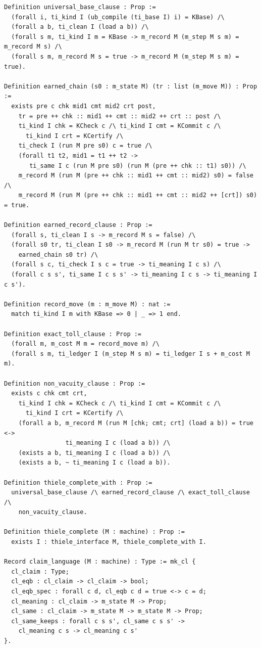 {\scriptsize
\begin{verbatim}
Definition universal_base_clause : Prop :=
  (forall i, ti_kind I (ub_compile (ti_base I) i) = KBase) /\
  (forall a b, ti_clean I (load a b)) /\
  (forall s m, ti_kind I m = KBase -> m_record M (m_step M s m) = m_record M s) /\
  (forall s m, m_record M s = true -> m_record M (m_step M s m) = true).

Definition earned_chain (s0 : m_state M) (tr : list (m_move M)) : Prop :=
  exists pre c chk mid1 cmt mid2 crt post,
    tr = pre ++ chk :: mid1 ++ cmt :: mid2 ++ crt :: post /\
    ti_kind I chk = KCheck c /\ ti_kind I cmt = KCommit c /\
      ti_kind I crt = KCertify /\
    ti_check I (run M pre s0) c = true /\
    (forall t1 t2, mid1 = t1 ++ t2 ->
       ti_same I c (run M pre s0) (run M (pre ++ chk :: t1) s0)) /\
    m_record M (run M (pre ++ chk :: mid1 ++ cmt :: mid2) s0) = false /\
    m_record M (run M (pre ++ chk :: mid1 ++ cmt :: mid2 ++ [crt]) s0) = true.

Definition earned_record_clause : Prop :=
  (forall s, ti_clean I s -> m_record M s = false) /\
  (forall s0 tr, ti_clean I s0 -> m_record M (run M tr s0) = true ->
    earned_chain s0 tr) /\
  (forall s c, ti_check I s c = true -> ti_meaning I c s) /\
  (forall c s s', ti_same I c s s' -> ti_meaning I c s -> ti_meaning I c s').

Definition record_move (m : m_move M) : nat :=
  match ti_kind I m with KBase => 0 | _ => 1 end.

Definition exact_toll_clause : Prop :=
  (forall m, m_cost M m = record_move m) /\
  (forall s m, ti_ledger I (m_step M s m) = ti_ledger I s + m_cost M m).

Definition non_vacuity_clause : Prop :=
  exists c chk cmt crt,
    ti_kind I chk = KCheck c /\ ti_kind I cmt = KCommit c /\
      ti_kind I crt = KCertify /\
    (forall a b, m_record M (run M [chk; cmt; crt] (load a b)) = true <->
                 ti_meaning I c (load a b)) /\
    (exists a b, ti_meaning I c (load a b)) /\
    (exists a b, ~ ti_meaning I c (load a b)).

Definition thiele_complete_with : Prop :=
  universal_base_clause /\ earned_record_clause /\ exact_toll_clause /\
    non_vacuity_clause.

Definition thiele_complete (M : machine) : Prop :=
  exists I : thiele_interface M, thiele_complete_with I.

Record claim_language (M : machine) : Type := mk_cl {
  cl_claim : Type;
  cl_eqb : cl_claim -> cl_claim -> bool;
  cl_eqb_spec : forall c d, cl_eqb c d = true <-> c = d;
  cl_meaning : cl_claim -> m_state M -> Prop;
  cl_same : cl_claim -> m_state M -> m_state M -> Prop;
  cl_same_keeps : forall c s s', cl_same c s s' ->
    cl_meaning c s -> cl_meaning c s'
}.


\end{verbatim}}
